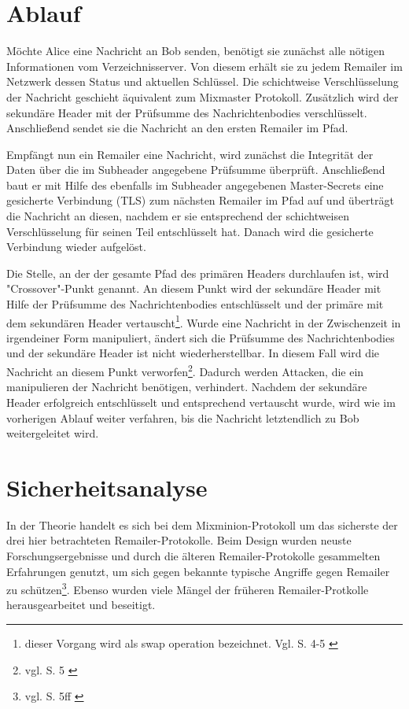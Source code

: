\section{Ablauf}
Möchte Alice eine Nachricht an Bob senden, benötigt sie zunächst alle nötigen Informationen vom Verzeichnisserver. Von diesem erhält sie zu jedem Remailer im Netzwerk dessen Status und aktuellen Schlüssel. Die schichtweise Verschlüsselung der Nachricht geschieht äquivalent zum Mixmaster Protokoll. Zusätzlich wird der sekundäre Header mit der Prüfsumme des Nachrichtenbodies verschlüsselt.
Anschließend sendet sie die Nachricht an den ersten Remailer im Pfad.

Empfängt nun ein Remailer eine Nachricht, wird zunächst die Integrität der Daten über die im Subheader angegebene Prüfsumme überprüft. Anschließend baut er mit Hilfe des ebenfalls im Subheader angegebenen Master-Secrets eine gesicherte Verbindung (TLS) zum nächsten Remailer im Pfad auf und überträgt die Nachricht an diesen, nachdem er sie entsprechend der schichtweisen Verschlüsselung für seinen Teil entschlüsselt hat. Danach wird die gesicherte Verbindung wieder aufgelöst.

Die Stelle, an der der gesamte Pfad des primären Headers durchlaufen ist, wird "Crossover"-Punkt genannt. An diesem Punkt wird der sekundäre Header mit Hilfe der Prüfsumme des Nachrichtenbodies entschlüsselt und der primäre mit dem sekundären Header vertauscht\footnote{dieser Vorgang wird als swap operation bezeichnet. Vgl. S. 4-5 \cite{mixminion}}. Wurde eine Nachricht in der Zwischenzeit in irgendeiner Form manipuliert, ändert sich die Prüfsumme des Nachrichtenbodies und der sekundäre Header ist nicht wiederherstellbar. In diesem Fall wird die Nachricht an diesem Punkt verworfen\footnote{vgl. S. 5 \cite{mixminion}}. Dadurch werden Attacken, die ein manipulieren der Nachricht benötigen, verhindert. Nachdem der sekundäre Header erfolgreich entschlüsselt und entsprechend vertauscht wurde, wird wie im vorherigen Ablauf weiter verfahren, bis die Nachricht letztendlich zu Bob weitergeleitet wird. 

\section{Sicherheitsanalyse}
In der Theorie handelt es sich bei dem Mixminion-Protokoll um das sicherste der drei hier betrachteten Remailer-Protokolle. Beim Design wurden neuste Forschungsergebnisse und durch die älteren Remailer-Protokolle gesammelten Erfahrungen genutzt, um sich gegen bekannte typische Angriffe gegen Remailer zu schützen\footnote{vgl. S. 5ff \cite{mixminion}}. Ebenso wurden viele Mängel der früheren Remailer-Protkolle herausgearbeitet und beseitigt. 

